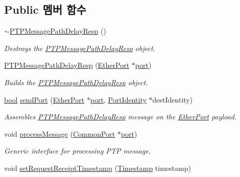 \subsection*{Public 멤버 함수}
\begin{DoxyCompactItemize}
\item 
\hyperlink{class_p_t_p_message_path_delay_resp_ad2f94da5f050c9a00f15ecc9cce6b044}{$\sim$\+P\+T\+P\+Message\+Path\+Delay\+Resp} ()
\begin{DoxyCompactList}\small\item\em Destroys the \hyperlink{class_p_t_p_message_path_delay_resp}{P\+T\+P\+Message\+Path\+Delay\+Resp} object. \end{DoxyCompactList}\item 
\hyperlink{class_p_t_p_message_path_delay_resp_a427ed7444d75aedf17db900b945eff80}{P\+T\+P\+Message\+Path\+Delay\+Resp} (\hyperlink{class_ether_port}{Ether\+Port} $\ast$\hyperlink{gst__avb__playbin_8c_a63c89c04d1feae07ca35558055155ffb}{port})
\begin{DoxyCompactList}\small\item\em Builds the \hyperlink{class_p_t_p_message_path_delay_resp}{P\+T\+P\+Message\+Path\+Delay\+Resp} object. \end{DoxyCompactList}\item 
\hyperlink{avb__gptp_8h_af6a258d8f3ee5206d682d799316314b1}{bool} \hyperlink{class_p_t_p_message_path_delay_resp_a0c6f07200fa46634360d356ebb10dfe0}{send\+Port} (\hyperlink{class_ether_port}{Ether\+Port} $\ast$\hyperlink{gst__avb__playbin_8c_a63c89c04d1feae07ca35558055155ffb}{port}, \hyperlink{class_port_identity}{Port\+Identity} $\ast$dest\+Identity)
\begin{DoxyCompactList}\small\item\em Assembles \hyperlink{class_p_t_p_message_path_delay_resp}{P\+T\+P\+Message\+Path\+Delay\+Resp} message on the \hyperlink{class_ether_port}{Ether\+Port} payload. \end{DoxyCompactList}\item 
void \hyperlink{class_p_t_p_message_path_delay_resp_a45670a42f5684252d52543f9ed3a1551}{process\+Message} (\hyperlink{class_common_port}{Common\+Port} $\ast$\hyperlink{gst__avb__playbin_8c_a63c89c04d1feae07ca35558055155ffb}{port})
\begin{DoxyCompactList}\small\item\em Generic interface for processing P\+TP message. \end{DoxyCompactList}\item 
void \hyperlink{class_p_t_p_message_path_delay_resp_a6200f7610dc57ce4b212bea2b69507fa}{set\+Request\+Receipt\+Timestamp} (\hyperlink{class_timestamp}{Timestamp} timestamp)

\end{DoxyCompactItemize}
